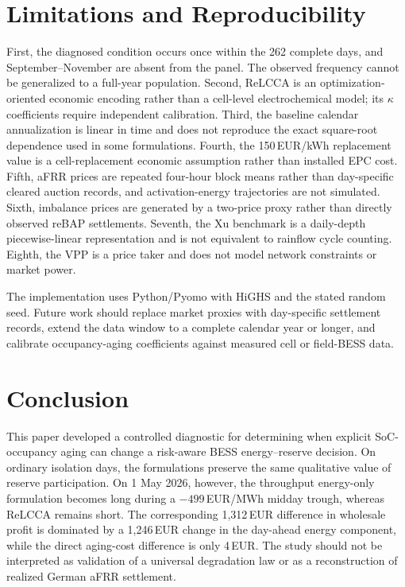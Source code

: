 \documentclass[journal,12pt,twocolumn]{IEEEtran}
\begin{document}
\section{Limitations and Reproducibility}
\label{sec:limitations}
First, the diagnosed condition occurs once within the 262 complete days, and September--November are absent from the panel. The observed frequency cannot be generalized to a full-year population. Second, ReLCCA is an optimization-oriented economic encoding rather than a cell-level electrochemical model; its $\kappa$ coefficients require independent calibration. Third, the baseline calendar annualization is linear in time and does not reproduce the exact square-root dependence used in some formulations. Fourth, the 150\,EUR/kWh replacement value is a cell-replacement economic assumption rather than installed EPC cost. Fifth, aFRR prices are repeated four-hour block means rather than day-specific cleared auction records, and activation-energy trajectories are not simulated. Sixth, imbalance prices are generated by a two-price proxy rather than directly observed reBAP settlements. Seventh, the Xu benchmark is a daily-depth piecewise-linear representation and is not equivalent to rainflow cycle counting. Eighth, the VPP is a price taker and does not model network constraints or market power.

The implementation uses Python/Pyomo with HiGHS \cite{Huangfu2018} and the stated random seed. Future work should replace market proxies with day-specific settlement records, extend the data window to a complete calendar year or longer, and calibrate occupancy-aging coefficients against measured cell or field-BESS data.

\section{Conclusion}
\label{sec:conclusion}
This paper developed a controlled diagnostic for determining when explicit SoC-occupancy aging can change a risk-aware BESS energy--reserve decision. On ordinary isolation days, the formulations preserve the same qualitative value of reserve participation. On 1 May 2026, however, the throughput energy-only formulation becomes long during a $-499$\,EUR/MWh midday trough, whereas ReLCCA remains short. The corresponding 1{,}312\,EUR difference in wholesale profit is dominated by a 1{,}246\,EUR change in the day-ahead energy component, while the direct aging-cost difference is only 4\,EUR. The study should not be interpreted as validation of a universal degradation law or as a reconstruction of realized German aFRR settlement.
\end{document}
